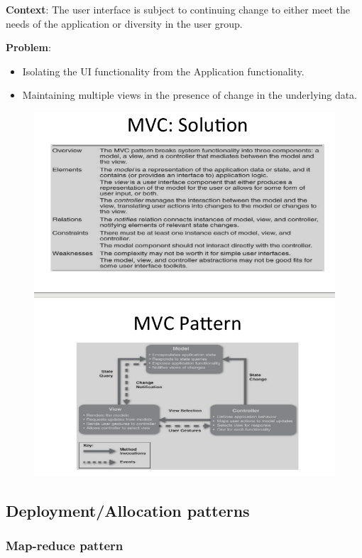 \documentclass[a4paper]{article}
\begin{document}
\textbf{Context}: The user interface is subject to continuing change to either
meet the needs of the application or diversity in the user group.

\textbf{Problem}:
\begin{itemize}
\item
  Isolating the UI functionality from the Application functionality.
\item
  Maintaining multiple views in the presence of change in the underlying data.
\end{itemize}


\begin{figure}[H]
  \hskip-2.0cm\includegraphics[scale=0.7]{images/mvc.png}
\end{figure}

\subsection{Deployment/Allocation patterns}

\subsubsection{Map-reduce pattern}
\end{document}
